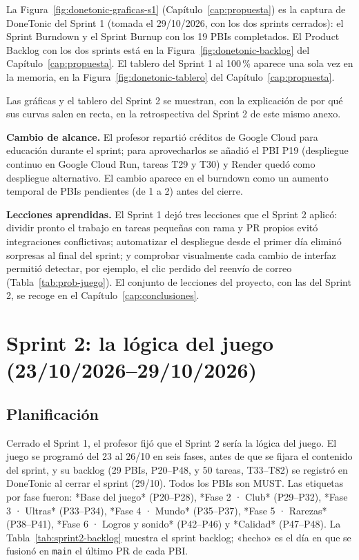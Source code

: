 La Figura~\ref{fig:donetonic-graficas-s1} (Capítulo~\ref{cap:propuesta}) es la captura de DoneTonic del Sprint 1 (tomada el 29/10/2026, con los dos sprints cerrados): el Sprint Burndown y el Sprint Burnup con los 19 PBIs completados. El Product Backlog con los dos sprints está en la Figura~\ref{fig:donetonic-backlog} del Capítulo~\ref{cap:propuesta}. El tablero del Sprint 1 al 100\,\% aparece una sola vez en la memoria, en la Figura~\ref{fig:donetonic-tablero} del Capítulo~\ref{cap:propuesta}.

Las gráficas y el tablero del Sprint 2 se muestran, con la explicación de por qué sus curvas salen en recta, en la retrospectiva del Sprint 2 de este mismo anexo.

\textbf{Cambio de alcance.} El profesor repartió créditos de Google Cloud para educación durante el sprint; para aprovecharlos se añadió el PBI P19 (despliegue continuo en Google Cloud Run, tareas T29 y T30) y Render quedó como despliegue alternativo. El cambio aparece en el burndown como un aumento temporal de PBIs pendientes (de 1 a 2) antes del cierre.

\textbf{Lecciones aprendidas.} El Sprint 1 dejó tres lecciones que el Sprint 2 aplicó: dividir pronto el trabajo en tareas pequeñas con rama y PR propios evitó integraciones conflictivas; automatizar el despliegue desde el primer día eliminó sorpresas al final del sprint; y comprobar visualmente cada cambio de interfaz permitió detectar, por ejemplo, el clic perdido del reenvío de correo (Tabla~\ref{tab:prob-juego}). El conjunto de lecciones del proyecto, con las del Sprint 2, se recoge en el Capítulo~\ref{cap:conclusiones}.

\section{Sprint 2: la lógica del juego (23/10/2026--29/10/2026)}

\subsection{Planificación}

Cerrado el Sprint 1, el profesor fijó que el Sprint 2 sería la lógica del juego. El juego se programó del 23 al 26/10 en seis fases, antes de que se fijara el contenido del sprint, y su backlog (29 PBIs, P20--P48, y 50 tareas, T33--T82) se registró en DoneTonic al cerrar el sprint (29/10). Todos los PBIs son MUST. Las etiquetas por fase fueron: *Base del juego* (P20--P28), *Fase 2 · Club* (P29--P32), *Fase 3 · Ultras* (P33--P34), *Fase 4 · Mundo* (P35--P37), *Fase 5 · Rarezas* (P38--P41), *Fase 6 · Logros y sonido* (P42--P46) y *Calidad* (P47--P48). La Tabla~\ref{tab:sprint2-backlog} muestra el sprint backlog; «hecho» es el día en que se fusionó en \texttt{main} el último PR de cada PBI.

